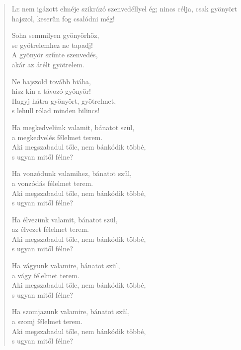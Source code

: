
\begin{verse}

{\par%
\lettrine[slope=0.5em]{L}{e} {\LettrineTextFont nem igázott elméje}\newline
szikrázó szenvedéllyel ég;\newline
nincs célja, csak gyönyört hajszol,\verselinebreak
keserűn fog csalódni még!
\par}

 Soha semmilyen gyönyörhöz,\\
se gyötrelemhez ne tapadj!\\
A gyönyör szűnte szenvedés,\\
akár az átélt gyötrelem.

 Ne hajszold tovább hiába,\\
hisz kín a távozó gyönyör!\\
Hagyj hátra gyönyört, gyötrelmet,\\
s lehull rólad minden bilincs!

 Ha megkedvelünk valamit, bánatot szül,\\
a megkedvelés félelmet terem.\\
Aki megszabadul tőle, nem bánkódik többé,\\
s ugyan mitől félne?

 Ha vonzódunk valamihez, bánatot szül,\\
a vonzódás félelmet terem.\\
Aki megszabadul tőle, nem bánkódik többé,\\
s ugyan mitől félne?

 Ha élvezünk valamit, bánatot szül,\\
az élvezet félelmet terem.\\
Aki megszabadul tőle, nem bánkódik többé,\\
s ugyan mitől félne?

 Ha vágyunk valamire, bánatot szül,\\
a vágy félelmet terem.\\
Aki megszabadul tőle, nem bánkódik többé,\\
s ugyan mitől félne?

 Ha szomjazunk valamire, bánatot szül,\\
a szomj félelmet terem.\\
Aki megszabadul tőle, nem bánkódik többé,\\
s ugyan mitől félne?


\end{verse}
